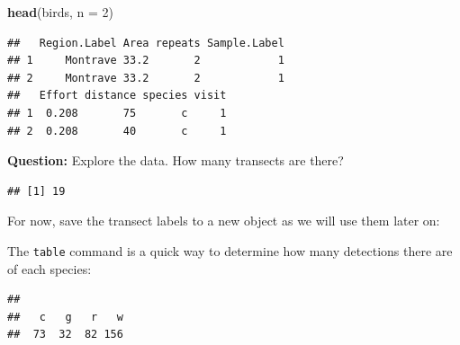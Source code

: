 \documentclass[10pt,a4paper]{tufte-handout}
\newenvironment{Shaded}{\begin{snugshade}}{\end{snugshade}}
\newcommand{\DataTypeTok}[1]{\textcolor[rgb]{0.13,0.29,0.53}{#1}}
\newcommand{\DecValTok}[1]{\textcolor[rgb]{0.00,0.00,0.81}{#1}}
\newcommand{\KeywordTok}[1]{\textcolor[rgb]{0.13,0.29,0.53}{\textbf{#1}}}
\newcommand{\NormalTok}[1]{#1}
\newcommand{\OperatorTok}[1]{\textcolor[rgb]{0.81,0.36,0.00}{\textbf{#1}}}
\newcommand{\StringTok}[1]{\textcolor[rgb]{0.31,0.60,0.02}{#1}}
\begin{document}
\begin{Shaded}
\begin{Highlighting}[]
\KeywordTok{head}\NormalTok{(birds, }\DataTypeTok{n =} \DecValTok{2}\NormalTok{)}
\end{Highlighting}
\end{Shaded}

\begin{verbatim}
##   Region.Label Area repeats Sample.Label
## 1     Montrave 33.2       2            1
## 2     Montrave 33.2       2            1
##   Effort distance species visit
## 1  0.208       75       c     1
## 2  0.208       40       c     1
\end{verbatim}

\begin{marginfigure}
\textbf{Question:} Explore the data. How many transects are there?
\end{marginfigure}

\begin{Shaded}
\end{Shaded}

\begin{verbatim}
## [1] 19
\end{verbatim}

For now, save the transect labels to a new object as we will use them
later on:

\begin{Shaded}
\end{Shaded}

The \texttt{table} command is a quick way to determine how many
detections there are of each species:

\begin{Shaded}
\end{Shaded}

\begin{verbatim}
## 
##   c   g   r   w 
##  73  32  82 156
\end{verbatim}
\end{document}
